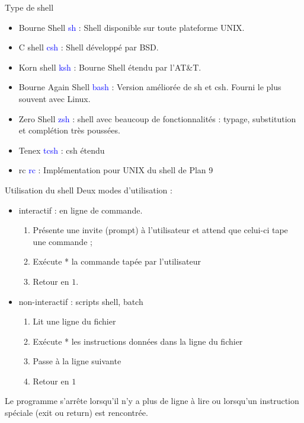 \documentclass[10pt]{beamer}
\newcommand{\param}[1]{\textcolor{blue}{#1}}
\begin{document}
\begin{frame}{Type de shell}
\begin{itemize}
\item \alert{Bourne Shell}  \param{sh} : Shell disponible sur toute plateforme UNIX.
\item \alert{C shell}  \param{csh} : Shell développé par BSD.
\item \alert{Korn shell}  \param{ksh} : Bourne Shell étendu par l’AT\&T.
\item \alert{Bourne Again Shell} \param{bash} : Version améliorée de sh et csh. Fourni le plus souvent avec Linux.
\item \alert{Zero Shell}  \param{zsh} : shell avec beaucoup de fonctionnalités : typage, substitution et complétion très poussées.
\item \alert{Tenex} \param{tcsh}  : csh étendu
\item \alert{rc} \param{rc}  : Implémentation pour UNIX du shell de Plan 9
\end{itemize}
\end{frame}

\begin{frame}{Utilisation du shell}
Deux modes d’utilisation :
\begin{itemize}
\item interactif : en ligne de commande.
\begin{enumerate}
  \item Présente une invite (prompt) à l’utilisateur et attend que celui-ci tape une commande ;
  \item Exécute * la commande tapée par l’utilisateur
  \item Retour en $1$.
\end{enumerate}
\item non-interactif : scripts shell, batch
  \begin{enumerate}
  \item Lit une ligne du fichier
  \item Exécute * les instructions données dans la ligne du fichier
  \item Passe à la ligne suivante
  \item Retour en $1$
  \end{enumerate}
\end{itemize}

Le programme s’arrête lorsqu’il n’y a plus de ligne à lire ou lorsqu’un instruction spéciale (exit ou return) est rencontrée.

\end{frame}
\end{document}
